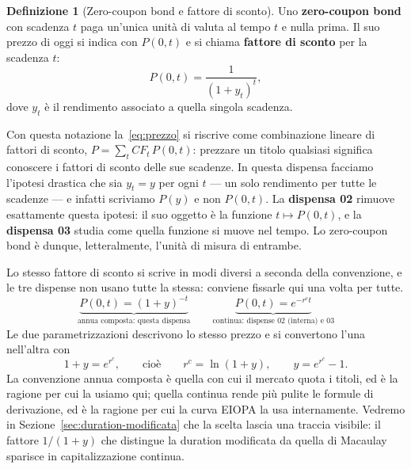 \documentclass[11pt,a4paper]{article}
\theoremstyle{plain}
\theoremstyle{definition}
\newtheorem{definizione}[teorema]{Definizione}
\theoremstyle{remark}
\begin{document}
\begin{definizione}[Zero-coupon bond e fattore di sconto]
\label{def:zcb}
Uno \textbf{zero-coupon bond} con scadenza $t$ paga un'unica unità di valuta al tempo $t$ e
nulla prima. Il suo prezzo di oggi si indica con $P(0,t)$ e si chiama \textbf{fattore di
sconto} per la scadenza $t$:
\begin{equation}
  P(0,t) = \frac{1}{(1+y_t)^{t}},
  \label{eq:zcb}
\end{equation}
dove $y_t$ è il rendimento associato a quella singola scadenza.
\end{definizione}

Con questa notazione la~\eqref{eq:prezzo} si riscrive come combinazione lineare di fattori di
sconto, $P = \sum_t CF_t\,P(0,t)$: prezzare un titolo qualsiasi significa conoscere i fattori
di sconto delle sue scadenze. In questa dispensa facciamo l'ipotesi drastica che sia
$y_t = y$ per ogni $t$ --- un solo rendimento per tutte le scadenze --- e infatti scriviamo
$P(y)$ e non $P(0,t)$. La \textbf{dispensa 02} rimuove esattamente questa ipotesi: il suo
oggetto è la funzione $t \mapsto P(0,t)$, e la \textbf{dispensa 03} studia come quella funzione
si muove nel tempo. Lo zero-coupon bond è dunque, letteralmente, l'unità di misura di entrambe.

\begin{keybox}
Lo stesso fattore di sconto si scrive in modi diversi a seconda della convenzione, e le tre
dispense non usano tutte la stessa: conviene fissarle qui una volta per tutte.
\[
  \underbrace{P(0,t) = (1+y)^{-t}}_{\text{annua composta: questa dispensa}}
  \qquad
  \underbrace{P(0,t) = e^{-r^c t}}_{\text{continua: dispense 02 (interna) e 03}}
\]
Le due parametrizzazioni descrivono lo stesso prezzo e si convertono l'una nell'altra con
\begin{equation}
  1 + y = e^{r^c}, \qquad\text{cioè}\qquad r^c = \ln(1+y), \qquad y = e^{r^c}-1.
  \label{eq:conversione-capitalizzazione}
\end{equation}
La convenzione annua composta è quella con cui il mercato quota i titoli, ed è la ragione per
cui la usiamo qui; quella continua rende più pulite le formule di derivazione, ed è la ragione
per cui la curva EIOPA la usa internamente. Vedremo in
Sezione~\ref{sec:duration-modificata} che la scelta lascia una traccia visibile: il fattore
$1/(1+y)$ che distingue la duration modificata da quella di Macaulay sparisce in
capitalizzazione continua.
\end{keybox}
\end{document}
